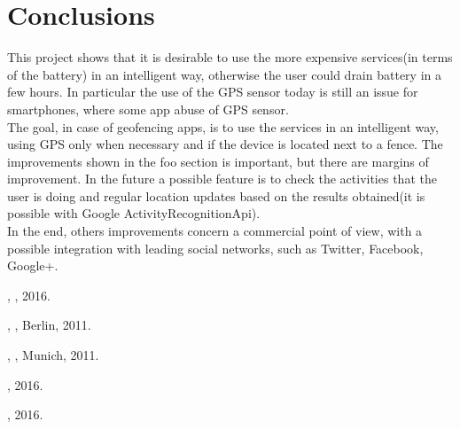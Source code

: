 \documentclass[conference]{IEEEtran}
\begin{document}
\section{Conclusions}
This project shows that it is desirable to use the more expensive services(in terms of the battery) in an intelligent way, otherwise the user could drain battery in a few hours.
In particular the use of the GPS sensor today is still an issue for smartphones, where some app abuse of GPS sensor. \\
The goal, in case of geofencing apps, is to use the services in an intelligent way, using GPS only when necessary and if the device is located next to a fence.
The improvements shown in the foo section is important, but there are margins of improvement.
In the future a possible feature is to check the activities that the user is doing and regular location updates based on the results obtained(it is possible with Google ActivityRecognitionApi).\\
In the end, others improvements concern a commercial point of view, with a possible integration with leading social networks, such as Twitter, Facebook, Google+.


\begin{thebibliography}{15}

,
, 2016.

,
, Berlin, 2011.

,
, Munich, 2011.

, 2016.

, 2016.

\end{thebibliography}
\end{document}

